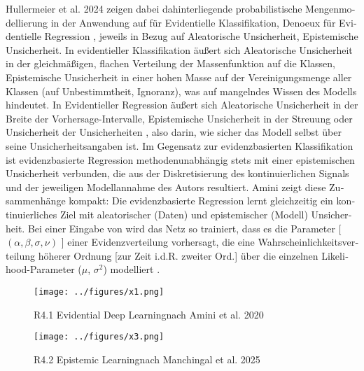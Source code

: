 \begin{otherlanguage}{ngerman}
Hullermeier et al. 2024 zeigen dabei dahinterliegende probabilistische Mengenmodellierung \parencite{javanmardi2024conformalized} in der Anwendung auf für Evidentielle Klassifikation, Denoeux für Evidentielle Regression \parencite{denoeux2022evidential}, jeweils in Bezug auf \gls{Aleatorische Unsicherheit}, \gls{Epistemische Unsicherheit}. In evidentieller Klassifikation äußert sich \gls{Aleatorische Unsicherheit} in der gleichmäßigen, flachen Verteilung der Massenfunktion auf die Klassen, \gls{Epistemische Unsicherheit} in einer hohen Masse auf der Vereinigungsmenge aller Klassen (auf Unbestimmtheit, Ignoranz), was auf mangelndes Wissen des Modells hindeutet. In Evidentieller Regression äußert sich \gls{Aleatorische Unsicherheit} in der Breite der Vorhersage-Intervalle, \gls{Epistemische Unsicherheit} in der Streuung oder \glqq Unsicherheit der Unsicherheiten \grqq, also darin, wie sicher das Modell selbst über seine Unsicherheitsangaben ist. Im Gegensatz zur evidenzbasierten Klassifikation ist evidenzbasierte Regression methodenunabhängig stets mit einer epistemischen Unsicherheit verbunden, die aus der Diskretisierung des kontinuierlichen Signals und der jeweiligen Modellannahme des Autors resultiert. Amini zeigt diese Zusammenhänge kompakt: \glqq Die evidenzbasierte Regression
lernt gleichzeitig ein kontinuierliches Ziel mit aleatorischer
(Daten) und epistemischer (Modell) Unsicherheit. Bei einer Eingabe von
wird das Netz so trainiert, dass es die Parameter [ $(\alpha, \beta, \sigma, \nu)$ ] einer Evidenzverteilung vorhersagt, die eine Wahrscheinlichkeitsverteilung höherer Ordnung [zur Zeit i.d.R. zweiter Ord.] über die einzelnen Likelihood-Parameter ($\mu$, $\sigma^{2}$) modelliert \grqq \parencite[S.1, Figure 1]{amini2020deep}.

\begin{figure}[!ht]
  \centering
  \texttt{[image: ../figures/x1.png]}
  \caption{R4.1 \glqq Evidential Deep Learning\grqq nach Amini et al. 2020}
\end{figure}


\begin{figure}[!ht]
  \centering
  \texttt{[image: ../figures/x3.png]}
  \caption{R4.2 \glqq Epistemic Learning\grqq nach Manchingal et al. 2025}
\end{figure}


\end{otherlanguage}
